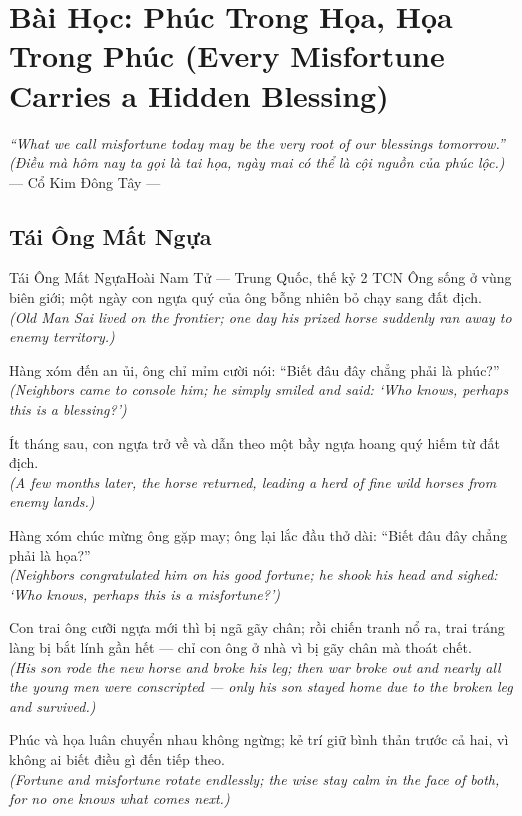 \chapter{Bài Học: Phúc Trong Họa, Họa Trong Phúc (Every Misfortune Carries a Hidden Blessing)}
\begin{center}
  \textit{\color{truyengold}``What we call misfortune today may be the very root of our blessings tomorrow.''}\\[4pt]
  \textit{(Điều mà hôm nay ta gọi là tai họa, ngày mai có thể là cội nguồn của phúc lộc.)}\\[4pt]
  \small\color{truyenblue}--- Cổ Kim Đông Tây ---
\end{center}
\ngancach

\section{Tái Ông Mất Ngựa}
\begin{truyen}{Tái Ông Mất Ngựa}{Hoài Nam Tử --- Trung Quốc, thế kỷ 2 TCN}
 Ông sống ở vùng biên giới; một ngày con ngựa quý của ông bỗng nhiên bỏ chạy sang đất địch.\\[4pt]
\textit{(Old Man Sai lived on the frontier; one day his prized horse suddenly ran away to enemy territory.)}

Hàng xóm đến an ủi, ông chỉ mỉm cười nói: ``Biết đâu đây chẳng phải là phúc?''\\[4pt]
\textit{(Neighbors came to console him; he simply smiled and said: `Who knows, perhaps this is a blessing?')}

Ít tháng sau, con ngựa trở về và dẫn theo một bầy ngựa hoang quý hiếm từ đất địch.\\[4pt]
\textit{(A few months later, the horse returned, leading a herd of fine wild horses from enemy lands.)}

Hàng xóm chúc mừng ông gặp may; ông lại lắc đầu thở dài: ``Biết đâu đây chẳng phải là họa?''\\[4pt]
\textit{(Neighbors congratulated him on his good fortune; he shook his head and sighed: `Who knows, perhaps this is a misfortune?')}

Con trai ông cưỡi ngựa mới thì bị ngã gãy chân; rồi chiến tranh nổ ra, trai tráng làng bị bắt lính gần hết --- chỉ con ông ở nhà vì bị gãy chân mà thoát chết.\\[4pt]
\textit{(His son rode the new horse and broke his leg; then war broke out and nearly all the young men were conscripted --- only his son stayed home due to the broken leg and survived.)}

\end{truyen}
\begin{baihoc}
  Phúc và họa luân chuyển nhau không ngừng; kẻ trí giữ bình thản trước cả hai, vì không ai biết điều gì đến tiếp theo.\\[4pt]
  \textit{(Fortune and misfortune rotate endlessly; the wise stay calm in the face of both, for no one knows what comes next.)}
\end{baihoc}

